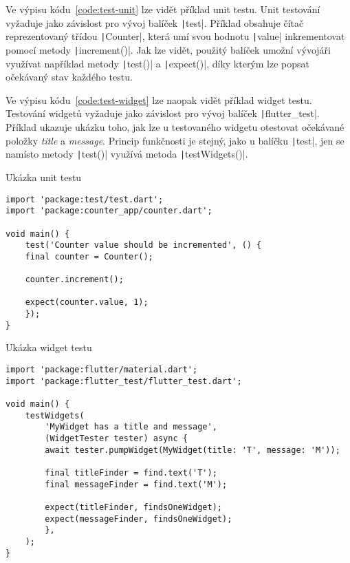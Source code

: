 Ve výpisu kódu~\ref{code:test-unit} lze vidět příklad unit testu.
\cite{testing_flutter_unit}
Unit testování vyžaduje jako závislost pro vývoj balíček
\texttt|test|.
Příklad obsahuje čítač reprezentovaný třídou \texttt|Counter|,
která umí svou hodnotu \texttt|value| inkrementovat pomocí
metody \texttt|increment()|.
Jak lze vidět,
použitý balíček umožní vývojáři využívat například metody
\texttt|test()| a \texttt|expect()|,
díky kterým lze popsat očekávaný stav každého testu.

Ve výpisu kódu~\ref{code:test-widget} lze naopak vidět příklad widget testu.
\cite{testing_flutter_widget}
Testování widgetů vyžaduje jako závislost pro vývoj balíček
\texttt|flutter_test|.
Příklad ukazuje ukázku toho,
jak lze u testovaného widgetu otestovat očekávané položky \emph{title}
a \emph{message}.
Princip funkčnosti je stejný,
jako u balíčku \texttt|test|,
jen se namísto metody \texttt|test()|
využívá metoda \texttt|testWidgets()|.

\begin{listing}
    \caption{Ukázka unit testu~\cite{testing_flutter_unit}}
    \label{code:test-unit}
    \begin{verbatim}
import 'package:test/test.dart';
import 'package:counter_app/counter.dart';

void main() {
    test('Counter value should be incremented', () {
    final counter = Counter();

    counter.increment();

    expect(counter.value, 1);
    });
}
    \end{verbatim}
\end{listing}

\begin{listing}
    \caption{Ukázka widget testu~\cite{testing_flutter_widget}}
    \label{code:test-widget}
    \begin{verbatim}
import 'package:flutter/material.dart';
import 'package:flutter_test/flutter_test.dart';

void main() {
    testWidgets(
        'MyWidget has a title and message',
        (WidgetTester tester) async {
        await tester.pumpWidget(MyWidget(title: 'T', message: 'M'));

        final titleFinder = find.text('T');
        final messageFinder = find.text('M');

        expect(titleFinder, findsOneWidget);
        expect(messageFinder, findsOneWidget);
        },
    );
}
    \end{verbatim}
\end{listing}

